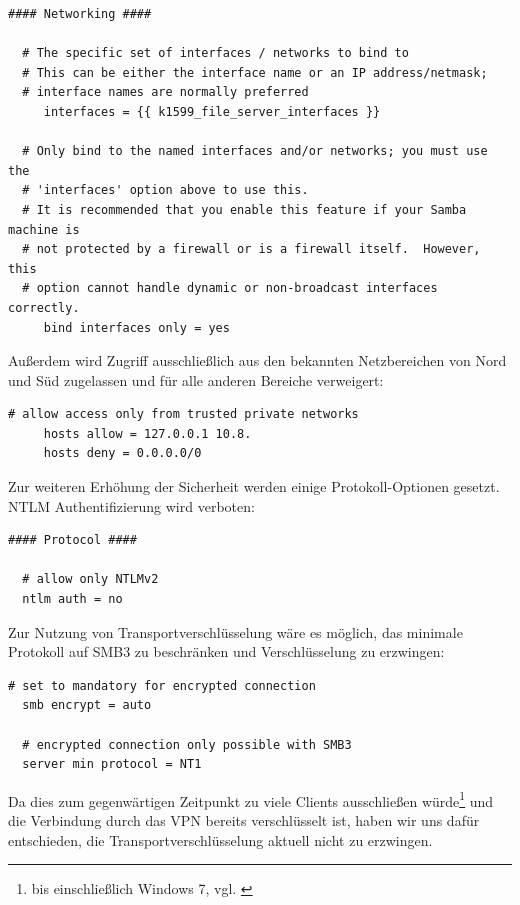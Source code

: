 \begin{lstlisting}[label=code:smbconf1,caption=Ausschnitt aus /etc/samba/smb.conf]
  #### Networking ####

  # The specific set of interfaces / networks to bind to
  # This can be either the interface name or an IP address/netmask;
  # interface names are normally preferred
     interfaces = {{ k1599_file_server_interfaces }}

  # Only bind to the named interfaces and/or networks; you must use the
  # 'interfaces' option above to use this.
  # It is recommended that you enable this feature if your Samba machine is
  # not protected by a firewall or is a firewall itself.  However, this
  # option cannot handle dynamic or non-broadcast interfaces correctly.
     bind interfaces only = yes
\end{lstlisting}

Außerdem wird Zugriff ausschließlich aus den bekannten Netzbereichen von Nord und Süd zugelassen und für alle anderen Bereiche verweigert:

\begin{lstlisting}[label=code:smbconf2,caption=Ausschnitt aus /etc/samba/smb.conf]
  # allow access only from trusted private networks
     hosts allow = 127.0.0.1 10.8.
     hosts deny = 0.0.0.0/0
\end{lstlisting}

Zur weiteren Erhöhung der Sicherheit werden einige Protokoll-Optionen gesetzt. NTLM Authentifizierung wird verboten:

\begin{lstlisting}[label=code:smbconf3,caption=Ausschnitt aus /etc/samba/smb.conf]
  #### Protocol ####

  # allow only NTLMv2
  ntlm auth = no
  \end{lstlisting}
Zur Nutzung von Transportverschlüsselung wäre es möglich, das minimale Protokoll auf SMB3 zu beschränken und Verschlüsselung zu erzwingen:
\begin{lstlisting}[label=code:smbconf4,caption=Möglicher Eintrag in /etc/samba/smb.conf]
  # set to mandatory for encrypted connection
  smb encrypt = auto

  # encrypted connection only possible with SMB3
  server min protocol = NT1
  \end{lstlisting}

Da dies zum gegenwärtigen Zeitpunkt zu viele Clients ausschließen würde\footnote{bis einschließlich Windows 7, vgl. \cite{smbHistory}} und die Verbindung durch das VPN bereits verschlüsselt ist, haben wir uns dafür entschieden, die Transportverschlüsselung aktuell nicht zu erzwingen.

